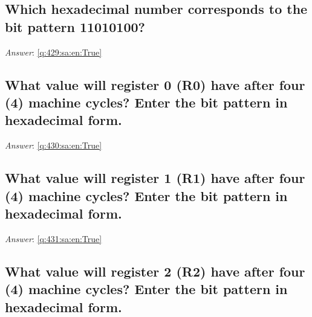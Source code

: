 \documentclass[a4paper,11pt,oneside]{article}
\begin{document}
\begin{sloppypar}
\subsection{Which hexadecimal number corresponds to the bit pattern 11010100?}

\label{q:429:sa:en:False}

\vspace{2cm}

\noindent\makebox[\textwidth]{\hrulefill}

\vspace{1cm}

\textit{Answer}: \autoref{q:429:sa:en:True}



\subsection{What value will register 0 (R0) have after four (4) machine cycles? Enter the bit pattern in hexadecimal form.}

\label{q:430:sa:en:False}

\vspace{2cm}

\noindent\makebox[\textwidth]{\hrulefill}

\vspace{1cm}

\textit{Answer}: \autoref{q:430:sa:en:True}



\subsection{What value will register 1 (R1) have after four (4) machine cycles? Enter the bit pattern in hexadecimal form.}

\label{q:431:sa:en:False}

\vspace{2cm}

\noindent\makebox[\textwidth]{\hrulefill}

\vspace{1cm}

\textit{Answer}: \autoref{q:431:sa:en:True}



\subsection{What value will register 2 (R2) have after four (4) machine cycles? Enter the bit pattern in hexadecimal form.}


\end{sloppypar}
\end{document}
